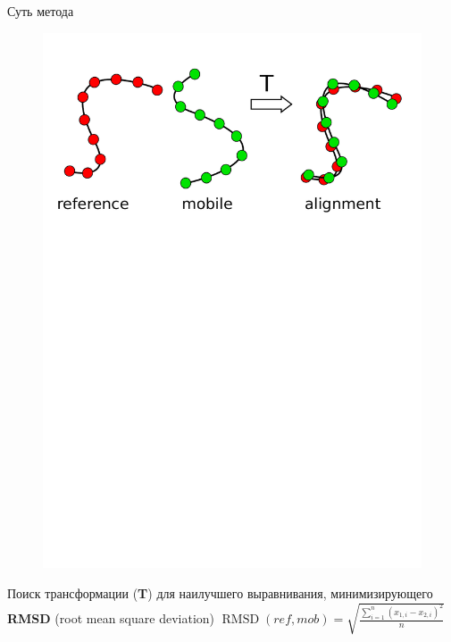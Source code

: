 \documentclass[utf8, professionalfonts]{beamer}
\begin{document}
\begin{frame}{Суть метода}
\begin{figure}[h]
\includegraphics[clip, trim=0 19.5cm 0 1cm, width=\linewidth]{method.pdf}
\end{figure}

Поиск трансформации ({\bf T}) для наилучшего выравнивания, минимизирующего {\bf RMSD} (root mean square deviation)
\begin{math}
\operatorname{RMSD}(ref, mob) = \sqrt{\frac{\sum_{i=1}^n (x_{1,i} - x_{2,i})^2}{n}}
\end{math}

\end{frame}
\end{document}
